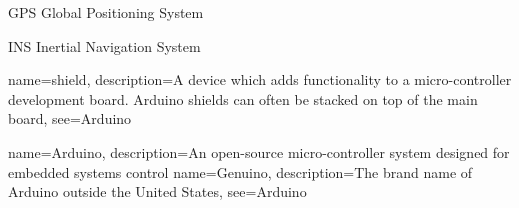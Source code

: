 %
%

{GPS}
{Global Positioning System}

{INS}
{Inertial Navigation System}

{name=shield,
description={A device which adds functionality to a micro-controller development board. Arduino shields can often be stacked on top of the main board},
see={Arduino}
}

{name=Arduino,
description={An open-source micro-controller system designed for embedded systems control}
}
{name=Genuino,
description={The brand name of Arduino outside the United States},
see={Arduino}
}
